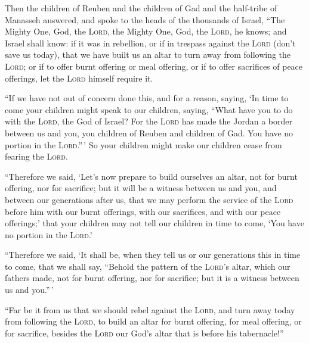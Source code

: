  Then the children of Reuben and the children of Gad and
the half-tribe of Manasseh answered, and spoke to the heads of the
thousands of Israel,  ``The Mighty One, God, the
\textsc{Lord}, the Mighty One, God, the \textsc{Lord}, he knows; and
Israel shall know: if it was in rebellion, or if in trespass against the
\textsc{Lord} (don't save us today),  that we have built
us an altar to turn away from following the \textsc{Lord}; or if to
offer burnt offering or meal offering, or if to offer sacrifices of
peace offerings, let the \textsc{Lord} himself require it.

 ``If we have not out of concern done this, and for a
reason, saying, `In time to come your children might speak to our
children, saying, ``What have you to do with the \textsc{Lord}, the God
of Israel?  For the \textsc{Lord} has made the Jordan a
border between us and you, you children of Reuben and children of Gad.
You have no portion in the \textsc{Lord}.''\,' So your children might
make our children cease from fearing the \textsc{Lord}.

 ``Therefore we said, `Let's now prepare to build
ourselves an altar, not for burnt offering, nor for sacrifice;
 but it will be a witness between us and you, and between
our generations after us, that we may perform the service of the
\textsc{Lord} before him with our burnt offerings, with our sacrifices,
and with our peace offerings;' that your children may not tell our
children in time to come, `You have no portion in the \textsc{Lord}.'

 ``Therefore we said, `It shall be, when they tell us or
our generations this in time to come, that we shall say, ``Behold the
pattern of the \textsc{Lord}'s altar, which our fathers made, not for
burnt offering, nor for sacrifice; but it is a witness between us and
you.''\,'

 ``Far be it from us that we should rebel against the
\textsc{Lord}, and turn away today from following the \textsc{Lord}, to
build an altar for burnt offering, for meal offering, or for sacrifice,
besides the \textsc{Lord} our God's altar that is before his
tabernacle!''

